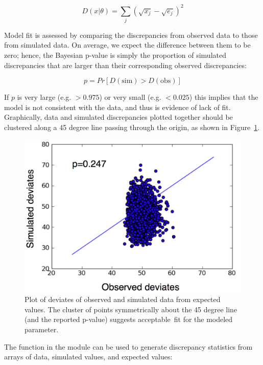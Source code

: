 \documentclass[]{jss}
\begin{document}
\begin{equation}
  D(x|\theta) = \sum_j (\sqrt{x_j}-\sqrt{e_j})^2
\end{equation}

Model fit is assessed by comparing the discrepancies from observed data to those from simulated data. On average, we expect the difference between them to be zero; hence, the Bayesian p-value is simply the proportion of simulated discrepancies that are larger than their corresponding observed discrepancies:

\begin{equation}
  p = Pr[ D(\text{sim}) > D(\text{obs}) ]
\end{equation}

If $p$ is very large (e.g. $>0.975$) or very small (e.g. $<0.025$) this implies that the model is not consistent with the data, and thus is evidence of lack of fit. Graphically, data and simulated discrepancies plotted together should be clustered along a 45 degree line passing through the origin, as shown in Figure~\ref{fig:deviate}.

\begin{figure}[ht!]
        \begin{center}
        \includegraphics{deviates.png}
    \end{center}
    \caption{Plot of deviates of observed and simulated data from expected values. The cluster of points symmetrically about the 45 degree line (and the reported p-value) suggests acceptable~fit for the modeled parameter.}
    \label{fig:deviate}
\end{figure}
% 
The  function in the  module can be used to generate discrepancy statistics from arrays of data, simulated values, and expected values:
\end{document}
